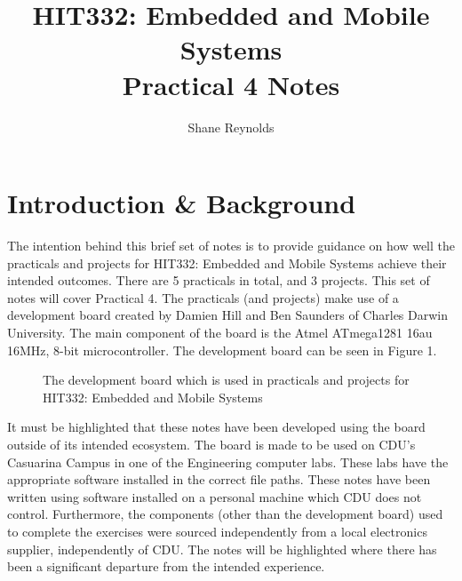 \documentclass[a4paper]{article}
\begin{document}
\title{HIT332: Embedded and Mobile Systems\\ Practical 4 Notes}
\author{Shane Reynolds}
\maketitle

\tableofcontents

\section{Introduction \& Background}

The intention behind this brief set of notes is to provide guidance on how well the practicals and projects for HIT332: Embedded and Mobile Systems achieve their intended outcomes. There are 5 practicals in total, and 3 projects. This set of notes will cover Practical 4. The practicals (and projects) make use of a development board created by Damien Hill and Ben Saunders of Charles Darwin University. The main component of the board is the Atmel ATmega1281 16au 16MHz, 8-bit microcontroller. The development board can be seen in Figure 1.

\begin{figure}[h]
	\centering
	\caption{The development board which is used in practicals and projects for HIT332: Embedded and Mobile Systems}
\end{figure}

It must be highlighted that these notes have been developed using the board outside of its intended ecosystem. The board is made to be used on CDU's Casuarina Campus in one of the Engineering computer labs. These labs have the appropriate software installed in the correct file paths. These notes have been written using software installed on a personal machine which CDU does not control. Furthermore, the components (other than the development board) used to complete the exercises were sourced independently from a local electronics supplier, independently of CDU. The notes will be highlighted where there has been a significant departure from the intended experience.
\end{document}
